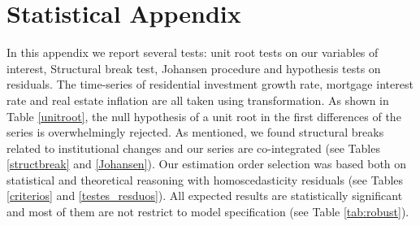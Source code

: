 \section{Statistical Appendix}\label{appen:A}

In this appendix we report several tests: unit root tests on our variables of interest, Structural break test, Johansen procedure and hypothesis tests on residuals. 
The time-series of residential investment growth rate, mortgage interest rate and real estate inflation are all taken using \textcite{yeo_new_2000} transformation.  
As shown in Table \ref{unitroot}, the null hypothesis of a unit root in the first differences of the series is overwhelmingly rejected.
As mentioned, we found structural breaks related to institutional changes and our series are co-integrated (see Tables \ref{structbreak} and \ref{Johansen}).
Our estimation order selection was based both on statistical and theoretical reasoning with homoscedasticity residuals (see Tables \ref{criterios} and \ref{testes_resduos}).
All expected results are statistically significant and most of them are not restrict to model specification (see Table \ref{tab:robust}).







